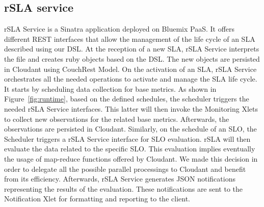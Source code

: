 \subsection{rSLA service}
rSLA Service is a Sinatra application deployed on Bluemix PaaS. It offers different REST interfaces that allow the management of the life cycle of an SLA described using our DSL.
At the reception of a new SLA, rSLA Service interprets the file and creates ruby objects based on the DSL. The new objects are persisted in Cloudant using CouchRest Model.
On the activation of an SLA, rSLA Service orchestrates all the needed operations to activate and manage the SLA life cycle. It starts by scheduling data collection for base 
metrics. As shown in Figure~\ref{fig:runtime}, based on the defined schedules, the scheduler triggers the needed rSLA Service interfaces. This latter will then invoke the 
Monitoring Xlets to collect new observations for the related base metrics. Afterwards, the observations are persisted in Cloudant. Similarly, on the schedule of an SLO, the 
Scheduler triggers a rSLA Service interface for SLO evaluation. rSLA will then evaluate the data related to the specific SLO. This evaluation implies 
eventually the usage of map-reduce functions offered by Cloudant. We made this decision in order to delegate all the possible parallel processings to Cloudant and benefit from its 
efficiency. Afterwards, rSLA Service generates JSON notifications representing the results of the evaluation. These notifications are sent to the Notification Xlet for 
formatting and reporting to the client.   
